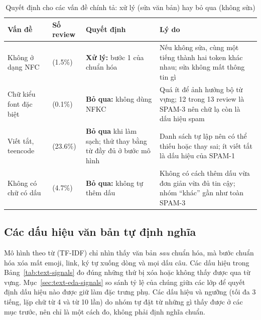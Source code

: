 \begin{table}[H]
\centering
\caption{Quyết định cho các vấn đề chính tả: xử lý (sửa văn bản) hay bỏ qua (không sửa)}
\label{tab:text-spelling-decision}
\small
\begin{tabular}{>{\raggedright\arraybackslash}p{3.0cm}>{\raggedright\arraybackslash}p{2.0cm}>{\raggedright\arraybackslash}p{3.8cm}>{\raggedright\arraybackslash}p{5.6cm}}
\toprule
Vấn đề & Số review & Quyết định & Lý do\\
\midrule
Không ở dạng NFC & 214 (1.5\%) & \textbf{Xử lý:} bước 1 của chuẩn hóa & Nếu không sửa, cùng một tiếng thành hai token khác nhau; sửa không mất thông tin gì\\
Chữ kiểu font đặc biệt & 13 (0.1\%) & \textbf{Bỏ qua:} không dùng NFKC & Quá ít để ảnh hưởng bộ từ vựng; 12 trong 13 review là SPAM-3 nên chữ lạ còn là dấu hiệu spam\\
Viết tắt, teencode & 3382 (23.6\%) & \textbf{Bỏ qua} khi làm sạch; thử thay bằng từ đầy đủ ở bước mô hình & Danh sách tự lập nên có thể thiếu hoặc thay sai; ít viết tắt là dấu hiệu của SPAM-1\\
Không có chữ có dấu & 678 (4.7\%) & \textbf{Bỏ qua:} không tự thêm dấu & Không có cách thêm dấu vừa đơn giản vừa đủ tin cậy; nhóm ``khác'' gần như toàn SPAM-3\\
\bottomrule
\end{tabular}
\end{table}

\subsection{Các dấu hiệu văn bản tự định nghĩa}
\label{sec:text-signal-def}
Mô hình theo từ (TF-IDF) chỉ nhìn thấy văn bản \emph{sau} chuẩn hóa, mà bước chuẩn hóa xóa mất emoji, link, ký tự xuống dòng và mọi
dấu câu. Các dấu hiệu trong Bảng~\ref{tab:text-signals} đo đúng những thứ bị xóa hoặc không thấy được qua từ vựng. Mục~\ref{sec:text-eda-signals}
so sánh tỷ lệ của chúng giữa các lớp để quyết định dấu hiệu nào được giữ làm đặc trưng phụ. Các dấu hiệu và ngưỡng (tối đa 3 tiếng,
lặp chữ từ 4 và từ 10 lần) do nhóm tự đặt từ những gì thấy được ở các mục trước, nên chỉ là một cách đo, không phải định nghĩa chuẩn.

